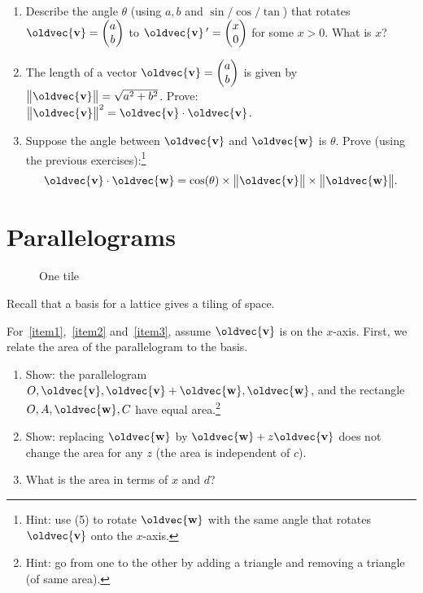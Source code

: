 \documentclass[10pt,a4paper]{article}
\newcommand{\twovec}[2]{\ensuremath{\begin{pmatrix}{#1}\\{#2}\end{pmatrix}}}
\renewcommand{\vec}[1]{\oldvec{\mathbf{#1}}}
\DeclarePairedDelimiter{\norm}{\big\lVert}{\big\rVert}
\begin{document}
\begin{enumerate}
	\begin{figure}[h!]
		\centering{}
	\end{figure}
\item Describe the angle \(\theta\) (using \(a, b\) and \(\sin/\cos/\tan\)) that rotates \(\vec{v} = \twovec{a}{b}\) to \(\vec{v}\,' = \twovec{x}{0}\) for some \(x > 0\).
	What is \(x\)?

\item The length of a vector \(\vec{v} = \twovec{a}{b}\) is given by \(\norm{\vec{v}} = \sqrt{a^2 + b^2}\).
	Prove: \(\norm{\vec{v}}^2 = \vec{v} \cdot \vec{v}\).

\item Suppose the angle between \(\vec{v}\) and \(\vec{w}\) is \(\theta\).
	Prove (using the previous exercises):\footnote{Hint: use (5) to rotate \(\vec{w}\) with the same angle that rotates \(\vec{v}\) onto the \(x\)-axis.}
	\[\vec{v} \cdot \vec{w} = \cos(\theta) \times \norm{\vec{v}} \times \norm{\vec{w}}.\]
\end{enumerate}

\clearpage
\section{Parallelograms}

\begin{wrapfigure}[5]{r}[1em]{.3\textwidth}
		\vspace*{-4em}
		\caption{One tile}
\end{wrapfigure}

Recall that a basis for a lattice gives a tiling of space.

For~\ref{item1},~\ref{item2} and~\ref{item3}, assume \(\vec{v}\) is on the \(x\)-axis.
First, we relate the area of the parallelogram to the basis.
\begin{enumerate}
	\item\label{item1} Show: the parallelogram \(O, \vec{v}, \vec{v}+\vec{w}, \vec{w}\), and the rectangle \(O, A, \vec{w}, C\) have equal
		area.\footnote{Hint: go from one to the other by adding a triangle and removing a triangle (of same area).}
	\item\label{item2} Show:
		replacing \(\vec{w}\) by \(\vec{w} + z \vec{v}\) does not change the area for any \(z\)
		(the area is independent of \(c\)).
	\item\label{item3} What is the area in terms of \(x\) and \(d\)?
\end{enumerate}
\end{document}
